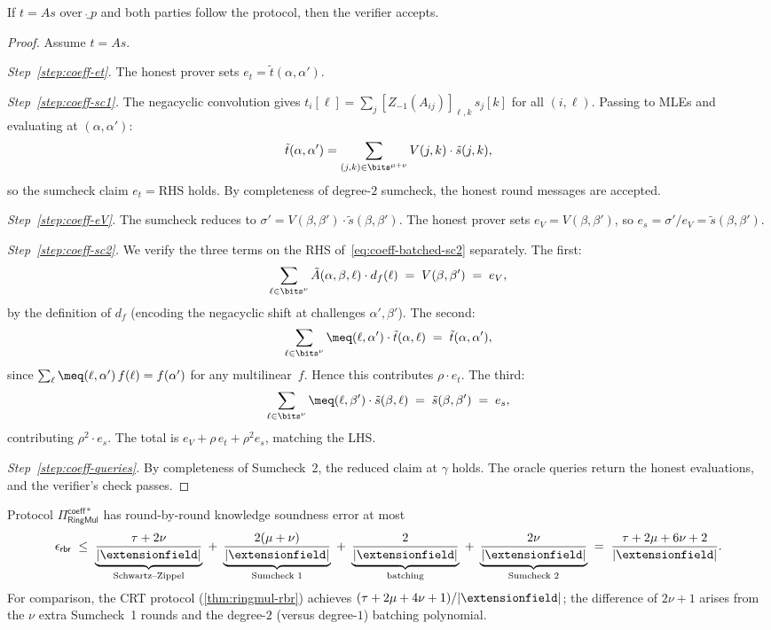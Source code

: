 \begin{theorem}[Completeness]
If $t = As$ over $\ring_p$ and both parties follow the protocol,
then the verifier accepts.
\end{theorem}

\begin{proof}
Assume $t = As$.

\emph{Step~\ref{step:coeff-et}.}
The honest prover sets $e_t = \tilde{t}(\alpha,\alpha')$.

\emph{Step~\ref{step:coeff-sc1}.}
The negacyclic convolution gives
$t_i[\ell] = \sum_j [Z_{-1}(A_{ij})]_{\ell,k}\, s_j[k]$
for all $(i,\ell)$.  Passing to MLEs and evaluating at $(\alpha,\alpha')$:
\[
    \tilde{t}(\alpha,\alpha')
    = \sum_{(j,k) \in \bits^{\mu+\nu}} V(j,k) \cdot \tilde{s}(j,k),
\]
so the sumcheck claim $e_t = \text{RHS}$ holds.  By completeness
of degree-$2$ sumcheck, the honest round messages are accepted.

\emph{Step~\ref{step:coeff-eV}.}
The sumcheck reduces to $\sigma' = V(\beta,\beta') \cdot \tilde{s}(\beta,\beta')$.
The honest prover sets $e_V = V(\beta,\beta')$, so
$e_s = \sigma'/e_V = \tilde{s}(\beta,\beta')$.

\emph{Step~\ref{step:coeff-sc2}.}
We verify the three terms on the RHS of~\eqref{eq:coeff-batched-sc2}
separately.  The first:
\[
    \sum_{\ell \in \bits^\nu} \tilde{A}(\alpha,\beta,\ell) \cdot d_f(\ell)
    \;=\; V(\beta,\beta') \;=\; e_V,
\]
by the definition of $d_f$ (encoding the negacyclic shift at
challenges $\alpha',\beta'$).  The second:
\[
    \sum_{\ell \in \bits^\nu} \meq(\ell,\alpha') \cdot \tilde{t}(\alpha,\ell)
    \;=\; \tilde{t}(\alpha,\alpha'),
\]
since $\sum_\ell \meq(\ell,\alpha')\, f(\ell) = f(\alpha')$ for any
multilinear~$f$.  Hence this contributes $\rho \cdot e_t$.
The third:
\[
    \sum_{\ell \in \bits^\nu} \meq(\ell,\beta') \cdot \tilde{s}(\beta,\ell)
    \;=\; \tilde{s}(\beta,\beta') \;=\; e_s,
\]
contributing $\rho^2 \cdot e_s$.  The total is
$e_V + \rho\, e_t + \rho^2 e_s$, matching the LHS.

\emph{Step~\ref{step:coeff-queries}.}
By completeness of Sumcheck~2, the reduced claim at $\gamma$ holds.
The oracle queries return the honest evaluations, and the verifier's
check passes.
\end{proof}


\begin{theorem}[Soundness]
Protocol $\Pi_{\mathsf{RingMul}}^{\mathsf{coeff*}}$ has
round-by-round knowledge soundness error at most
\[
    \epsilon_{\mathsf{rbr}}
    \;\leq\;
    \underbrace{\frac{\tau + 2\nu}{|\extensionfield|}}_{\text{Schwartz--Zippel}}
    \;+\; \underbrace{\frac{2(\mu+\nu)}{|\extensionfield|}}_{\text{Sumcheck 1}}
    \;+\; \underbrace{\frac{2}{|\extensionfield|}}_{\text{batching}}
    \;+\; \underbrace{\frac{2\nu}{|\extensionfield|}}_{\text{Sumcheck 2}}
    \;=\;
    \frac{\tau + 2\mu + 6\nu + 2}{|\extensionfield|}.
\]
For comparison, the CRT protocol (\cref{thm:ringmul-rbr}) achieves
$(\tau + 2\mu + 4\nu + 1)/|\extensionfield|$; the difference of
$2\nu + 1$ arises from the $\nu$ extra Sumcheck~1 rounds and the
degree-$2$ (versus degree-$1$) batching polynomial.
\end{theorem}

